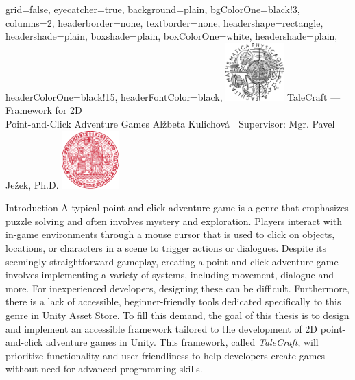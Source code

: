 \documentclass[portrait,a0paper,fontscale=0.33]{baposter}
\begin{document}
\color{black!80} %
\begin{poster}{grid=false,
	eyecatcher=true,
	background=plain,
	bgColorOne=black!3, %
	columns=2,
	headerborder=none,
	textborder=none,
	headershape=rectangle,
	headershade=plain,
	boxshade=plain,
	boxColorOne=white,
	headershade=plain,
	headerColorOne=black!15, %
	headerFontColor=black,
	}%
	{\includegraphics[height=6em]{logos/mff-black.pdf}}
	{TaleCraft — Framework for 2D\\ Point-and-Click Adventure Games}
	{\vspace{1ex} Alžbeta Kulichová | Supervisor: Mgr. Pavel Ježek, Ph.D.}
	{\includegraphics[height=6em]{logos/uk-red.pdf}}


%
%

\begin{posterbox}[column=0, span=1, name=background]{Introduction}
A typical point-and-click adventure game is a genre that emphasizes puzzle solving and often involves mystery and exploration. Players interact with in-game environments through a mouse cursor that is used to click on objects, locations, or characters in a scene to trigger actions or dialogues. Despite its seemingly straightforward gameplay, creating a point-and-click adventure game involves implementing a variety of systems, including movement, dialogue and more. For inexperienced developers, designing these can be difficult. Furthermore, there is a lack of accessible, beginner-friendly tools dedicated specifically to this genre in Unity Asset Store. To fill this demand, the goal of this thesis is to design and implement an accessible framework tailored to the development of 2D point-and-click adventure games in Unity. This framework, called \textit{TaleCraft}, will prioritize functionality and user-friendliness to help developers create games without need for advanced programming skills.
\end{posterbox}


\end{poster}
\end{document}
